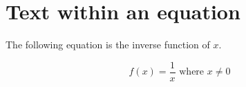 \documentclass{article}
\begin{document}
\section*{Text within an equation}

The following equation is the inverse function of $x$.


\[f(x) = \frac{1}{x} \text{ where } x \neq 0 \]
\end{document}

